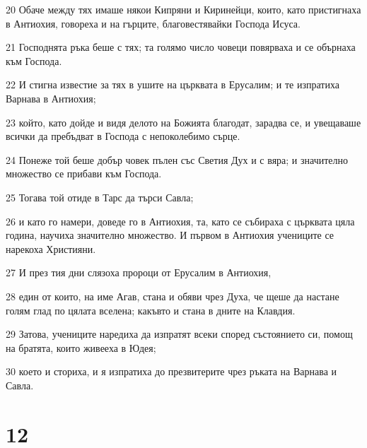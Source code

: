 \par 20 Обаче между тях имаше някои Кипряни и Киринейци, които, като пристигнаха в Антиохия, говореха и на гърците, благовестявайки Господа Исуса.
\par 21 Господнята ръка беше с тях; та голямо число човеци повярваха и се обърнаха към Господа.
\par 22 И стигна известие за тях в ушите на църквата в Ерусалим; и те изпратиха Варнава в Антиохия;
\par 23 който, като дойде и видя делото на Божията благодат, зарадва се, и увещаваше всички да пребъдват в Господа с непоколебимо сърце.
\par 24 Понеже той беше добър човек пълен със Светия Дух и с вяра; и значително множество се прибави към Господа.
\par 25 Тогава той отиде в Тарс да търси Савла;
\par 26 и като го намери, доведе го в Антиохия, та, като се събираха с църквата цяла година, научиха значително множество. И първом в Антиохия учениците се нарекоха Християни.
\par 27 И през тия дни слязоха пророци от Ерусалим в Антиохия,
\par 28 един от които, на име Агав, стана и обяви чрез Духа, че щеше да настане голям глад по цялата вселена; какъвто и стана в дните на Клавдия.
\par 29 Затова, учениците наредиха да изпратят всеки според състоянието си, помощ на братята, които живееха в Юдея;
\par 30 което и сториха, и я изпратиха до презвитерите чрез ръката на Варнава и Савла.

\chapter{12}

